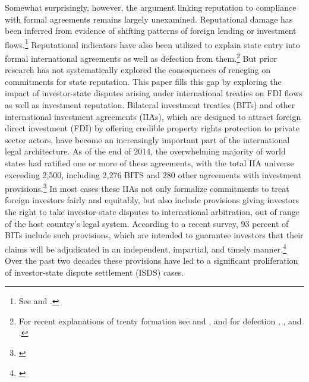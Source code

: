 \documentclass[12pt,onesided]{amsart}
\begin{document}
Somewhat surprisingly, however, the argument linking reputation to compliance with formal agreements remains largely unexamined. Reputational damage has been inferred from evidence of shifting patterns of foreign lending or investment flows.\footnote{See \citet{tomz:2007} and \citet{allee:peinhardt:2011}.} Reputational indicators have also been utilized to explain state entry into formal international agreements as well as defection from them.\footnote{For recent explanations of treaty formation see \citet{elkins:etal:2006} and \citet{simmons:danner:2010}, and for defection \citet{allee:peinhardt:2011}, \citet{freeman:2013}, and \citet{poulsen2013claim}.}  But prior research has not systematically explored the consequences of reneging on commitments for state reputation. This paper fills this gap by exploring the  impact of investor-state disputes arising under international treaties on FDI flows as well as investment reputation. Bilateral investment treaties (BITs) and other international investment agreements (IIAs), which are designed to attract foreign direct investment (FDI) by offering credible property rights protection to private sector actors, have become an increasingly important part of the international legal architecture. As of the end of 2014, the overwhelming majority of world states had ratified one or more of these agreements, with the total IIA universe exceeding 2,500, including 2,276 BITS and 280 other agreements with investment provisions.\footnote{\citet{unctad:2015}} In most cases these IIAs not only formalize commitments to treat foreign investors fairly and equitably, but also include provisions giving investors the right to take investor-state disputes to international arbitration, out of range of the host country's legal system. According to a recent survey, 93 percent of BITs include such provisions, which are intended to guarantee investors that their claims will be adjudicated in an independent, impartial, and timely manner.\footnote{\citet[p. 8]{gaukordger:gordon:2012}} Over the past two decades these provisions have led to a significant proliferation of investor-state dispute settlement (ISDS) cases.

\end{document}
